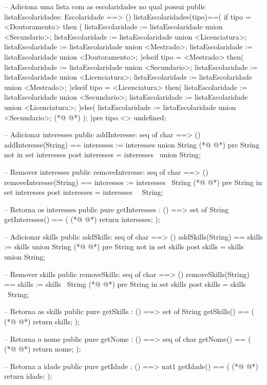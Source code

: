\begin{vdmpp}[breaklines=true]
 -- Adiciona uma lista com as escolaridades no qual possui
 public listaEscolaridades: Escolaridade ==> ()
 listaEscolaridades(tipo)==(
 if tipo = <Doutoramento> then (
  listaEscolaridade := listaEscolaridade union {<Secundario>};
  listaEscolaridade := listaEscolaridade union {<Licenciatura>};
  listaEscolaridade := listaEscolaridade union {<Mestrado>};
  listaEscolaridade := listaEscolaridade union {<Doutoramento>};
 )elseif tipo = <Mestrado> then(
  listaEscolaridade := listaEscolaridade union {<Secundario>};
  listaEscolaridade := listaEscolaridade union {<Licenciatura>};
  listaEscolaridade := listaEscolaridade union {<Mestrado>};
 )elseif tipo = <Licenciatura> then(
  listaEscolaridade := listaEscolaridade union {<Secundario>};
  listaEscolaridade := listaEscolaridade union {<Licenciatura>};
 )else(
  listaEscolaridade := listaEscolaridade union {<Secundario>};
(*@
\label{addInteresse:92}
@*)
 );
 )pre tipo <> undefined;
 
 -- Adicionar interesses
 public addInteresse: seq of char ==> ()
 addInteresse(String) == interesses := interesses union {String}
(*@
\label{removeInteresse:98}
@*)
 pre String not in set interesses
 post interesses = interesses~ union {String};
 
 -- Remover interesses
 public removeInteresse: seq of char ==> ()
 removeInteresse(String) == interesses := interesses \ {String}
(*@
\label{getInteresses:104}
@*)
 pre String in set interesses
 post interesses = interesses~ \ {String};
 
 -- Retorna os interesses
 public pure getInteresses : () ==> set of String
 getInteresses() ==
 (
(*@
\label{addSkills:111}
@*)
  return interesses;
 );
 
 -- Adicionar skills
 public addSkills: seq of char ==> ()
 addSkills(String) == skills := skills union {String}
(*@
\label{removeSkills:117}
@*)
 pre String not in set skills
 post skills = skills~ union {String};
 
 -- Remover skills
 public removeSkills: seq of char ==> ()
 removeSkills(String) == skills := skills \ {String}
(*@
\label{getSkills:123}
@*)
 pre String in set skills
 post skills = skills~ \ {String};
 
 -- Retorna as skills
 public pure getSkills : () ==> set of String
 getSkills() ==
 (
(*@
\label{getNome:130}
@*)
  return skills;
 );
 
 -- Retorna o nome
 public pure getNome : () ==> seq of char
 getNome() ==
 (
(*@
\label{getIdade:137}
@*)
  return nome;
 );
 
 -- Retorna a idade
 public pure getIdade : () ==> nat1
 getIdade() ==
 (
(*@
\label{getTelefone:144}
@*)
  return idade;
 );
 

\end{vdmpp}
